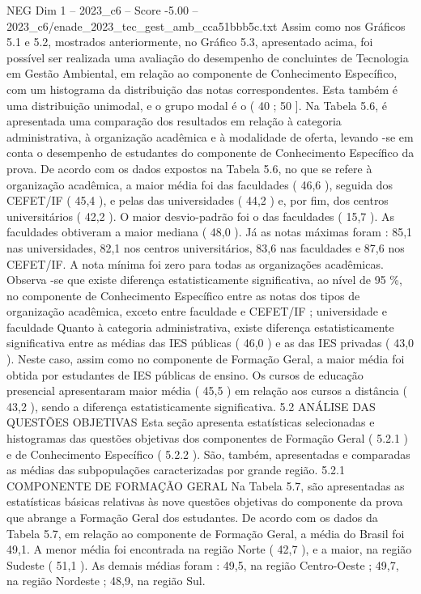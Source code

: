 \begin{textsample}{NEG Dim 1 – 2023\_c6 – Score -5.00 – 2023\_c6/enade\_2023\_tec\_gest\_amb\_cca51bbb5c.txt}
Assim como nos Gráficos 5.1 e 5.2, mostrados anteriormente, no Gráfico 5.3, apresentado acima, foi possível ser realizada uma avaliação do desempenho de concluintes de Tecnologia em Gestão Ambiental, em relação ao componente de Conhecimento Específico, com um histograma da distribuição das notas correspondentes.
Esta também é uma distribuição unimodal, e o grupo modal é o ( 40 ; 50 ].
Na Tabela 5.6, é apresentada uma comparação dos resultados em relação à categoria administrativa, à organização acadêmica e à modalidade de oferta, levando -se em conta o desempenho de estudantes do componente de Conhecimento Específico da prova.
De acordo com os dados expostos na Tabela 5.6, no que se refere à organização acadêmica, a maior média foi das faculdades ( 46,6 ), seguida dos CEFET/IF ( 45,4 ), e pelas das universidades ( 44,2 ) e, por fim, dos centros universitários ( 42,2 ).
O maior desvio-padrão foi o das faculdades ( 15,7 ).
As faculdades obtiveram a maior mediana ( 48,0 ).
Já as notas máximas foram : 85,1 nas universidades, 82,1 nos centros universitários, 83,6 nas faculdades e 87,6 nos CEFET/IF.
A nota mínima foi zero para todas as organizações acadêmicas.
Observa -se que existe diferença estatisticamente significativa, ao nível de 95 \%, no componente de Conhecimento Específico entre as notas dos tipos de organização acadêmica, exceto entre faculdade e CEFET/IF ; universidade e faculdade Quanto à categoria administrativa, existe diferença estatisticamente significativa entre as médias das IES públicas ( 46,0 ) e as das IES privadas ( 43,0 ).
Neste caso, assim como no componente de Formação Geral, a maior média foi obtida por estudantes de IES públicas de ensino.
Os cursos de educação presencial apresentaram maior média ( 45,5 ) em relação aos cursos a distância ( 43,2 ), sendo a diferença estatisticamente significativa. 5.2 ANÁLISE DAS QUESTÕES OBJETIVAS Esta seção apresenta estatísticas selecionadas e histogramas das questões objetivas dos componentes de Formação Geral ( 5.2.1 ) e de Conhecimento Específico ( 5.2.2 ).
São, também, apresentadas e comparadas as médias das subpopulações caracterizadas por grande região. 5.2.1 COMPONENTE DE FORMAÇÃO GERAL Na Tabela 5.7, são apresentadas as estatísticas básicas relativas às nove questões objetivas do componente da prova que abrange a Formação Geral dos estudantes.
De acordo com os dados da Tabela 5.7, em relação ao componente de Formação Geral, a média do Brasil foi 49,1.
A menor média foi encontrada na região Norte ( 42,7 ), e a maior, na região Sudeste ( 51,1 ).
As demais médias foram : 49,5, na região Centro-Oeste ; 49,7, na região Nordeste ; 48,9, na região Sul.

\end{textsample}
